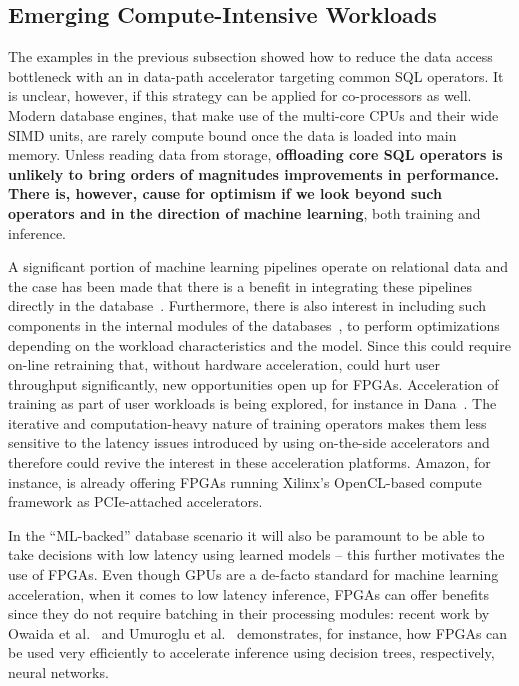 \documentclass[11pt]{article}
\begin{document}
\subsection{Emerging Compute-Intensive Workloads}


The examples in the previous subsection showed how to reduce the data access bottleneck with an in data-path accelerator targeting common SQL operators. It is unclear, however, if this strategy can be applied for co-processors as well.
Modern database engines, that make use of the multi-core CPUs and their wide SIMD units, are rarely compute bound once the data is loaded into main memory. Unless reading data from storage, \textbf{offloading core SQL operators is unlikely to bring orders of magnitudes improvements in performance. There is, however, cause for optimism if we look beyond such operators and in the direction of machine learning}, both training and inference.

A significant portion of machine learning pipelines operate on relational data and the case has been made that there is a benefit in integrating these pipelines directly in the database~\cite{mahajan-danafpga-vldb18}. Furthermore, there is also interest in including such components in the internal modules of the databases~\cite{kraska-sage-cidr19}, to perform optimizations depending on the workload characteristics and the model. Since this could require on-line retraining that, without hardware acceleration, could hurt user throughput significantly, new opportunities open up for FPGAs. Acceleration of training as part of user workloads is being explored, for instance in Dana~\cite{mahajan-danafpga-vldb18}. The iterative and computation-heavy nature of training operators makes them less sensitive to the latency issues introduced by using on-the-side accelerators and therefore could revive the interest in these acceleration platforms. Amazon, for instance, is already offering FPGAs running Xilinx's OpenCL-based compute framework as PCIe-attached accelerators. 

In the ``ML-backed'' database scenario it will also be paramount to be able to take decisions with low latency using learned models -- this further motivates the use of FPGAs. Even though GPUs are a de-facto standard for machine learning acceleration, when it comes to low latency inference, FPGAs can offer benefits since they do not require batching in their processing modules: recent work by Owaida et al.~\cite{owaida-trees-fpl17} and Umuroglu et al.~\cite{umuroglu-finn-fpga17} demonstrates, for instance, how FPGAs can be used very efficiently to accelerate inference using decision trees, respectively, neural networks. 
\end{document}
